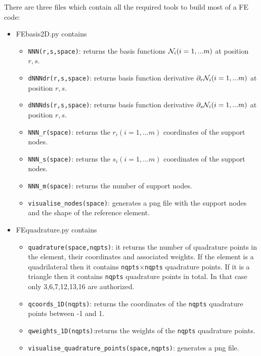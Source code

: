 There are three files which contain all the required tools to build most of a FE code:

\begin{itemize}

\item {\pythonfile FEbasis2D.py} contains 

\begin{itemize}
\item \lstinline{NNN(r,s,space)}: returns the basis functions ${\mathcal{N}}_i (i=1,...m)$ at position $r,s$.
\item \lstinline{dNNNdr(r,s,space)}: returns basis function derivative $\partial_r{\mathcal{N}}_i (i=1,...m)$ at position $r,s$.
\item \lstinline{dNNNds(r,s,space)}: returns basis function derivative $\partial_s{\mathcal{N}}_i (i=1,...m)$ at position $r,s$.
\item \lstinline{NNN_r(space)}: returns the $r_i (i=1,...m)$ coordinates of the support nodes.
\item \lstinline{NNN_s(space)}: returns the $s_i (i=1,...m)$ coordinates of the support nodes.
\item \lstinline{NNN_m(space)}: returns the number of support nodes.
\item \lstinline{visualise_nodes(space)}: generates a png file with the support nodes and the shape of the reference element.
\end{itemize}


\item {\pythonfile FEquadrature.py} contains
\begin{itemize}
\item \lstinline{quadrature(space,nqpts)}: it returns the number of quadrature points in the element, 
their coordinates and associated weights. If the element is a quadrilateral then it contains 
\lstinline{nqpts}$\times$\lstinline{nqpts} quadrature points. 
If it is a triangle then it contains \lstinline{nqpts} quadrature points in total. 
In that case only 3,6,7,12,13,16 are authorized.   
\item \lstinline{qcoords_1D(nqpts)}: returns the coordinates of the \lstinline{nqpts} quadrature points between -1 and 1.
\item \lstinline{qweights_1D(nqpts)}:returns the weights of the \lstinline{nqpts} quadrature points.
\item \lstinline{visualise_quadrature_points(space,nqpts)}: generates a png file.
\end{itemize}



\end{itemize}
